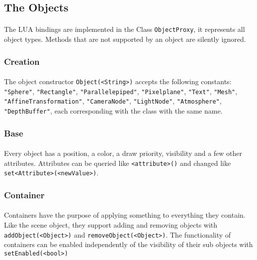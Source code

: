 \subsection{The Objects}
\paragraph{}
The LUA bindings are implemented in the Class \texttt{ObjectProxy}, it represents all object types.
Methods that are not supported by an object are silently ignored.

\subsubsection{Creation}
\paragraph{}
The object constructor \texttt{Object(<String>)} accepts the following constants: \texttt{"Sphere"}, \texttt{"Rectangle"}, \texttt{"Parallelepiped"}, \texttt{"Pixelplane"}, \texttt{"Text"}, \texttt{"Mesh"}, \texttt{"AffineTransformation"}, \texttt{"CameraNode"}, \texttt{"LightNode"}, \texttt{"Atmosphere"}, \texttt{"DepthBuffer"}, each corresponding with the class with the same name.

\subsubsection{Base}
\paragraph{}
Every object has a position, a color, a draw priority, visibility and a few other attributes.
Attributes can be queried like \texttt{<attribute>()} and changed like \texttt{set<Attribute>(<newValue>)}.

\subsubsection{Container}
\paragraph{}
Containers have the purpose of applying something to everything they contain.
Like the scene object, they support adding and removing objects with \texttt{addObject(<Object>)} and \texttt{removeObject(<Object>)}.
The functionality of containers can be enabled independently of the visibility of their sub objects with \texttt{setEnabled(<bool>)}

